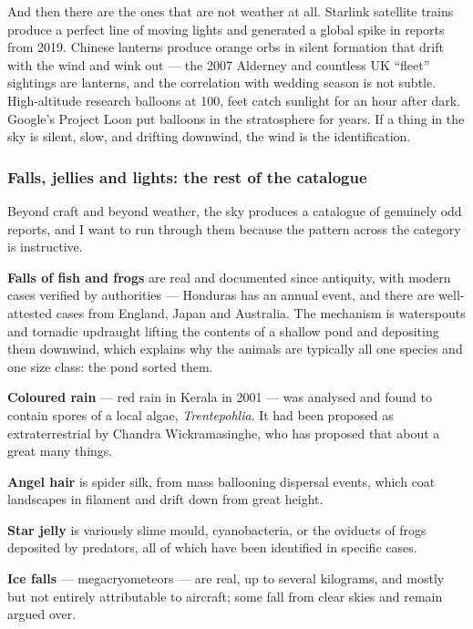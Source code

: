 \begin{funfact}
And then there are the ones that are not weather at all. Starlink satellite trains produce a
perfect line of moving lights and generated a global spike in reports from 2019. Chinese lanterns
produce orange orbs in silent formation that drift with the wind and wink out --- the 2007
Alderney and countless UK ``fleet'' sightings are lanterns, and the correlation with wedding
season is not subtle. High-altitude research balloons at 100, feet catch sunlight for an hour
after dark. Google's Project Loon put balloons in the stratosphere for years. If a thing in the
sky is silent, slow, and drifting downwind, the wind is the identification.
\end{funfact}

\subsubsection*{Falls, jellies and lights: the rest of the catalogue}

Beyond craft and beyond weather, the sky produces a catalogue of genuinely odd reports, and I want
to run through them because the pattern across the category is instructive.

\textbf{Falls of fish and frogs} are real and documented since antiquity, with modern cases
verified by authorities --- Honduras has an annual event, and there are well-attested cases from
England, Japan and Australia. The mechanism is waterspouts and tornadic updraught lifting the
contents of a shallow pond and depositing them downwind, which explains why the animals are
typically all one species and one size class: the pond sorted them.

\textbf{Coloured rain} --- red rain in Kerala in 2001 --- was analysed and found to contain spores
of a local algae, \emph{Trentepohlia}. It had been proposed as extraterrestrial by Chandra
Wickramasinghe, who has proposed that about a great many things.

\textbf{Angel hair} is spider silk, from mass ballooning dispersal events, which coat landscapes
in filament and drift down from great height.

\textbf{Star jelly} is variously slime mould, cyanobacteria, or the oviducts of frogs deposited by
predators, all of which have been identified in specific cases.

\textbf{Ice falls} --- megacryometeors --- are real, up to several kilograms, and mostly but not
entirely attributable to aircraft; some fall from clear skies and remain argued over.


